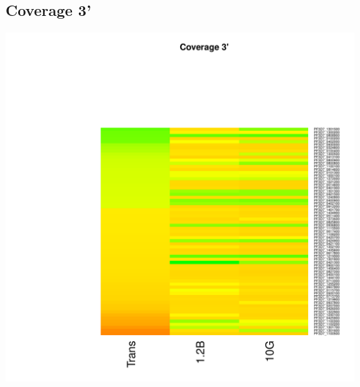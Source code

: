 \documentclass{article}\usepackage[]{graphicx}\usepackage[]{color}
\newenvironment{knitrout}{}{} %
\begin{document}
\subsection{Coverage 3'}
\begin{knitrout}
\color{fgcolor}

{\centering \includegraphics[width=.9\linewidth]{figure/minimal-heat_cov_tts-1} 

}



\end{knitrout}
\clearpage
\end{document}
